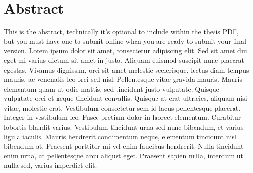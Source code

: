 \section*{Abstract}

\normalsize
This is the abstract, technically it's optional to include within the thesis PDF, but you must have one to submit online when you are ready to submit your final version.  Lorem ipsum dolor sit amet, consectetur adipiscing elit. Sed sit amet dui eget mi varius dictum sit amet in justo. Aliquam euismod suscipit nunc placerat egestas. Vivamus dignissim, orci sit amet molestie scelerisque, lectus diam tempus mauris, ac venenatis leo orci sed nisl. Pellentesque vitae gravida mauris. Mauris elementum quam ut odio mattis, sed tincidunt justo vulputate. Quisque vulputate orci et neque tincidunt convallis. Quisque at erat ultricies, aliquam nisi vitae, molestie erat. Vestibulum consectetur sem id lacus pellentesque placerat. Integer in vestibulum leo. Fusce pretium dolor in laoreet elementum. Curabitur lobortis blandit varius. Vestibulum tincidunt urna sed nunc bibendum, et varius ligula iaculis. Mauris hendrerit condimentum neque, elementum tincidunt nisl bibendum at. Praesent porttitor mi vel enim faucibus hendrerit. Nulla tincidunt enim urna, ut pellentesque arcu aliquet eget. Praesent sapien nulla, interdum ut nulla sed, varius imperdiet elit.
